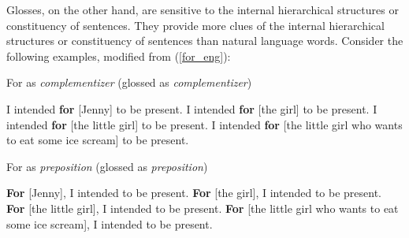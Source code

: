 \documentclass[final]{ua-thesis}
\numberwithin{equation}{section}
\begin{document}


Glosses, on the other hand, are sensitive to the internal hierarchical structures or constituency of sentences. They provide more clues of the internal hierarchical structures or constituency of sentences than natural language words. Consider the following examples, modified from (\ref{for_eng}):

\begin{exe}
\ex
For as \textit{complementizer} (glossed as \textit{complementizer})
	\begin{xlist}
	\ex I intended \textbf{for} [Jenny] to be present.
	\ex I intended \textbf{for} [the girl] to be present.
	\ex I intended \textbf{for} [the little girl] to be present.
	\ex I intended \textbf{for} [the little girl who wants to eat some ice scream] to be present. 
	\end{xlist}
\ex
For as \textit{preposition} (glossed as \textit{preposition})
	\begin{xlist}
	\ex \textbf{For} [Jenny], I intended to be present. 
	\ex \textbf{For} [the girl], I intended to be present. 
	\ex \textbf{For} [the little girl], I intended to be present. 
	\ex \textbf{For} [the little girl who wants to eat some ice scream], I intended to be present. 
	\end{xlist}
\end{exe}
\end{document}
